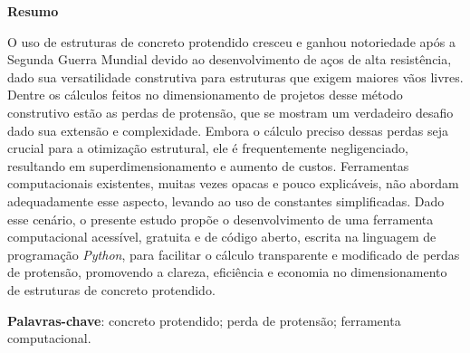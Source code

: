 \begin{center}
    \textbf{Resumo}
\end{center}

\noindent O uso de estruturas de concreto protendido cresceu e ganhou notoriedade após a Segunda Guerra Mundial devido ao desenvolvimento de aços de alta resistência, dado sua versatilidade construtiva para estruturas que exigem maiores vãos livres. Dentre os cálculos feitos no dimensionamento de projetos desse método construtivo estão as perdas de protensão, que se mostram um verdadeiro desafio dado sua extensão e complexidade. Embora o cálculo preciso dessas perdas seja crucial para a otimização estrutural, ele é frequentemente negligenciado, resultando em superdimensionamento e aumento de custos. Ferramentas computacionais existentes, muitas vezes opacas e pouco explicáveis, não abordam adequadamente esse aspecto, levando ao uso de constantes simplificadas. Dado esse cenário, o presente estudo propõe o desenvolvimento de uma ferramenta computacional acessível, gratuita e de código aberto, escrita na linguagem de programação \textit{Python}, para facilitar o cálculo transparente e modificado de perdas de protensão, promovendo a clareza, eficiência e economia no dimensionamento de estruturas de concreto protendido.
\vspace{0.2cm}

\noindent\textbf{Palavras-chave}: concreto protendido; perda de protensão; ferramenta computacional.